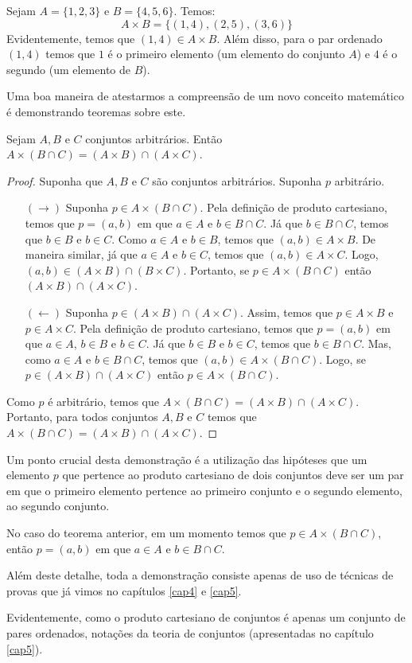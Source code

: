 \begin{Example}
Sejam $A =\{1,2,3\}$ e $B = \{4,5,6\}$. Temos:
\[
A \times B = \{(1,4),(2,5),(3,6)\}
\]
Evidentemente, temos que $(1,4) \in A \times B$. Além disso, para o
par ordenado $(1,4)$ temos que $1$ é o primeiro elemento (um elemento
do conjunto $A$) e $4$ é o segundo (um elemento de $B$).
\end{Example}
Uma boa maneira de atestarmos a compreensão de um novo conceito
matemático é demonstrando teoremas sobre este.
\begin{Theorem}
Sejam $A, B$ e $C$ conjuntos arbitrários. Então $A \times (B\cap C) =
(A \times B) \cap (A \times C)$.
\end{Theorem}
\begin{proof}
Suponha que $A,B$ e $C$ são conjuntos arbitrários. Suponha $p$
arbitrário.
\begin{itemize}
   \item[$(\to)$] Suponha $p \in A \times (B \cap C)$. Pela definição
     de produto cartesiano, temos que $p = (a,b)$ em que $a \in A$ e
     $b \in B \cap C$. Já que $b\in B\cap C$, temos que $b \in B$ e $b
     \in C$. Como $a \in A$ e $b \in B$, temos que $(a,b)\in A \times
     B$. De maneira similar, já que $a \in A$ e $b \in C$, temos que
     $(a,b) \in A \times C$. Logo, $(a,b) \in (A\times B) \cap
     (B\times C)$. Portanto, se $p \in A\times (B\cap C)$ então
     $(A\times B)\cap (A \times C)$.
   \item[$(\leftarrow)$] Suponha $p\in (A\times B) \cap (A \times
     C)$. Assim, temos que $p \in A \times B$ e $p \in A \times C$.
     Pela definição de produto cartesiano, temos que $p = (a,b)$ em
     que $a \in A$, $b \in B$ e $b\in C$. Já que $b\in B$ e $b\in C$,
     temos que $b\in B\cap C$. Mas, como $a \in A$ e $b\in B\cap C$,
     temos que $(a,b)\in A\times (B\cap C)$. Logo, se $p \in (A\times
     B) \cap (A \times C)$ então $p \in A \times (B\cap C)$.
\end{itemize}
Como $p$ é arbitrário, temos que $A \times (B\cap C) = (A \times B)
\cap (A \times C)$. Portanto, para todos conjuntos $A,B$ e $C$ temos
que $A \times (B\cap C) = (A \times B)
\cap (A \times C)$.
\end{proof}

\begin{Commentary}
Um ponto crucial desta demonstração é a utilização das hipóteses que
um elemento $p$ que pertence ao produto cartesiano de dois conjuntos
deve ser um par em que o primeiro elemento pertence ao primeiro
conjunto e o segundo elemento, ao segundo conjunto.

No caso do teorema anterior, em um momento temos que $p \in A \times
(B\cap C)$, então $p = (a,b)$ em que $a \in A$ e $b \in B\cap C$.

Além deste
detalhe, toda a demonstração consiste apenas de uso de técnicas de
provas que já vimos no capítulos \ref{cap4} e \ref{cap5}.

Evidentemente, como o produto cartesiano de conjuntos é apenas um
conjunto de pares ordenados, notações da teoria de conjuntos
(apresentadas no capítulo \ref{cap5}).
\end{Commentary}

